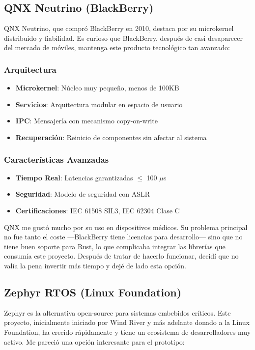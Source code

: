     \newpage
    \subsection{QNX Neutrino (BlackBerry)}
        QNX Neutrino, que compró BlackBerry en 2010, destaca por su microkernel distribuido y fiabilidad. Es curioso que BlackBerry, después de casi desaparecer del mercado de móviles, mantenga este producto tecnológico tan avanzado:

        \subsubsection{Arquitectura}
            \begin{itemize}
                \item \textbf{Microkernel}: Núcleo muy pequeño, menos de 100KB
                \item \textbf{Servicios}: Arquitectura modular en espacio de usuario
                \item \textbf{IPC}: Mensajería con mecanismo copy-on-write
                \item \textbf{Recuperación}: Reinicio de componentes sin afectar al sistema
            \end{itemize}

        \subsubsection{Características Avanzadas}
            \begin{itemize}
                \item \textbf{Tiempo Real}: Latencias garantizadas $\le$ 100 $\mu$s
                \item \textbf{Seguridad}: Modelo de seguridad con ASLR
                \item \textbf{Certificaciones}: IEC 61508 SIL3, IEC 62304 Clase C
            \end{itemize}

        QNX me gustó mucho por su uso en dispositivos médicos. Su problema principal no fue tanto el coste —BlackBerry tiene licencias para desarrollo— sino que no tiene buen soporte para Rust, lo que complicaba integrar las librerías que consumía este proyecto. Después de tratar de hacerlo funcionar, decidí que no valía la pena invertir más tiempo y dejé de lado esta opción.

    \newpage
    \subsection{Zephyr RTOS (Linux Foundation)}
        Zephyr es la alternativa open-source para sistemas embebidos críticos. Este proyecto, inicialmente iniciado por Wind River y más adelante donado a la Linux Foundation, ha crecido rápidamente y tiene un ecosistema de desarrolladores muy activo. Me pareció una opción interesante para el prototipo:

